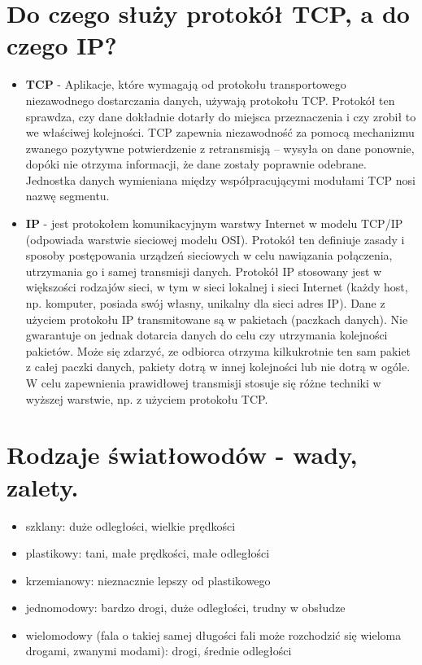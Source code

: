 \documentclass[12pt,a4paper]{article}
\begin{document}
	\section{Do czego służy protokół TCP, a do czego IP?}
	\begin{itemize}
		\item \textbf{TCP} - Aplikacje, które wymagają od protokołu transportowego niezawodnego dostarczania danych, używają protokołu TCP. Protokół ten sprawdza, czy dane dokładnie dotarły do miejsca przeznaczenia i czy zrobił to we właściwej kolejności. TCP zapewnia niezawodność za pomocą mechanizmu zwanego pozytywne potwierdzenie z retransmisją – wysyła on dane ponownie, dopóki nie otrzyma informacji, że dane zostały poprawnie odebrane. Jednostka danych wymieniana między współpracującymi modułami TCP nosi nazwę segmentu.
		\item \textbf{IP} - jest protokołem komunikacyjnym warstwy Internet w modelu TCP/IP (odpowiada warstwie sieciowej modelu OSI). Protokół ten definiuje zasady i sposoby postępowania urządzeń sieciowych w celu nawiązania połączenia, utrzymania go i samej transmisji danych. Protokół IP stosowany jest w większości rodzajów sieci, w tym w sieci lokalnej i sieci Internet (każdy host, np. komputer, posiada swój własny, unikalny dla sieci adres IP). Dane z użyciem protokołu IP transmitowane są w pakietach (paczkach danych). Nie gwarantuje on jednak dotarcia danych do celu czy utrzymania kolejności pakietów. Może się zdarzyć, ze odbiorca otrzyma kilkukrotnie ten sam pakiet z całej paczki danych, pakiety dotrą w innej kolejności lub nie dotrą w ogóle. W celu zapewnienia prawidłowej transmisji stosuje się różne techniki w wyższej warstwie, np. z użyciem protokołu TCP.
	\end{itemize}

	\section{Rodzaje światłowodów - wady, zalety.}
	\begin{itemize}
		\item szklany: duże odległości, wielkie prędkości
		\item plastikowy: tani, małe prędkości, małe odległości
		\item krzemianowy: nieznacznie lepszy od plastikowego
		\item jednomodowy: bardzo drogi, duże odległości, trudny w obsłudze
		\item wielomodowy (fala o takiej samej długości fali może rozchodzić się wieloma drogami, zwanymi modami): drogi, średnie odległości
	\end{itemize}
\end{document}
